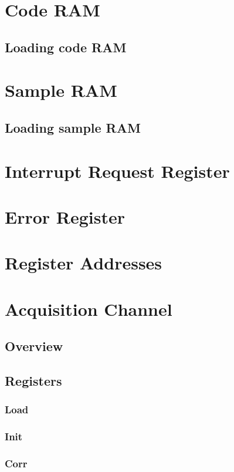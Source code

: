 \documentclass{article}
\begin{document}
\begin{multicols}{2}

\section{Code RAM}
\subsection{Loading code RAM}

\section{Sample RAM}
\subsection{Loading sample RAM}

\section{Interrupt Request Register}

\section{Error Register}

\section{Register Addresses}

\hypertarget{acqlink}{}
\section{Acquisition Channel}
\subsection{Overview}
\subsection{Registers}
\subsubsection{Load}
\subsubsection{Init}
\subsubsection{Corr}

\end{multicols}
\end{document}
